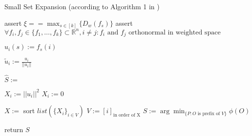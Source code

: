\begin{algorithm}[h!]
	\caption{Small Set Expansion (according to Algorithm 1 in \cite{ChanLTZ16}) \label{alg:small_set_expansion}} %
	
	
	\begin{algorithmic}
		\State assert $\xi == \max_{s\in [k]} \{D_w(f_s)\}$
		\State assert $\forall f_i, f_j \in \{f_1, \ldots , f_k\} \subset \mathbb{R}^n, i\neq j: f_i \text{ and } f_j \text{ orthonormal in weighted space} $
		
		\State	$u_i(s) := f_s(i) $
		\EndFor
		\EndFor
		
		\State $\tilde{u}_i := \frac{u_i}{||u_i||}$
		\EndFor
		
		\State $\hat{S} := $ 
		

		\State $X_i := ||u_i||^2$
		\Else
		\State $X_i := 0$
		\EndIf
		
		\EndFor
		\State $X:= $ sort $ list(\{X_i\}_{i \in V})$
		\State $V := [i]_{\text{in order of X}}$
		\State $S := \arg \min_{\{P: O \text{ is prefix of }V\}}\phi(O)$
		
		\State return $S$
		
	
	
		\EndFunction
		
		
	\end{algorithmic}
\end{algorithm} %


